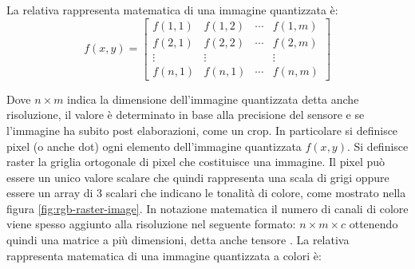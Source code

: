 La relativa rappresenta matematica di una immagine quantizzata è:
\[ f(x, y)=\left[\begin{array}{cccc}f(1,1) & f(1,2) & \cdots & f(1, m) \\ f(2,1) & f(2,2) & \cdots & f(2, m) \\ \vdots & \vdots & & \vdots \\ f(n,1) & f(n,1) & \cdots & f(n,m)\end{array}\right] \]

Dove \(n\times m\) indica la dimensione dell'immagine quantizzata detta anche risoluzione, il valore è determinato in base alla precisione del sensore e se l'immagine ha subito post elaborazioni, come un crop. In particolare si definisce pixel  (o anche dot) ogni elemento dell'immagine quantizzata \(f(x, y)\). Si definisce raster la griglia ortogonale di pixel che costituisce una immagine. Il pixel può essere un unico valore scalare che quindi rappresenta una scala di grigi oppure essere un array di 3 scalari che indicano le tonalità di colore, come mostrato nella figura \cref{fig:rgb-raster-image}. In notazione matematica il numero di canali di colore viene spesso aggiunto alla risoluzione nel seguente formato: \(n\times m \times c\) ottenendo quindi una matrice a più dimensioni, detta anche tensore \cite{gonzalez_dip}. La relativa rappresenta matematica di una immagine quantizzata a colori è:
\\
